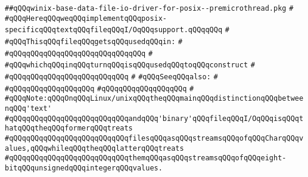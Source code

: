 \label{src/lib/std/src/io/winix-base-data-file-io-driver-for-posix--premicrothread.pkg}
\verb|##qQQqwinix-base-data-file-io-driver-for-posix--premicrothread.pkg|\newline
\verb|#|\newline
\verb|#qQQqHereqQQqweqQQqimplementqQQqposix-specificqQQqtextqQQqfileqQQqI/OqQQqsupport.qQQqqQQq|\newline
\verb|#|\newline
\verb|#qQQqThisqQQqfileqQQqgetsqQQqusedqQQqin:|\newline
\verb|#|\newline
\verb|#qQQqqQQqqQQqqQQqqQQqqQQqqQQqqQQq|\newline
\verb|#|\newline
\verb|#qQQqwhichqQQqinqQQqturnqQQqisqQQqusedqQQqtoqQQqconstruct|\newline
\verb|#|\newline
\verb|#qQQqqQQqqQQqqQQqqQQqqQQqqQQq|\newline
\verb|#|\newline
\verb|#qQQqSeeqQQqalso:|\newline
\verb|#|\newline
\verb|#qQQqqQQqqQQqqQQqqQQq|\newline
\verb|#qQQqqQQqqQQqqQQqqQQq|\newline
\verb|#|\newline
\verb|#qQQqNote:qQQqOnqQQqLinux/unixqQQqtheqQQqmainqQQqdistinctionqQQqbetweenqQQq'text'|\newline
\verb|#qQQqqQQqqQQqqQQqqQQqqQQqqQQqandqQQq'binary'qQQqfileqQQqI/OqQQqisqQQqthatqQQqtheqQQqformerqQQqtreats|\newline
\verb|#qQQqqQQqqQQqqQQqqQQqqQQqqQQqfilesqQQqasqQQqstreamsqQQqofqQQqCharqQQqvalues,qQQqwhileqQQqtheqQQqlatterqQQqtreats|\newline
\verb|#qQQqqQQqqQQqqQQqqQQqqQQqqQQqthemqQQqasqQQqstreamsqQQqofqQQqeight-bitqQQqunsignedqQQqintegerqQQqvalues.|\newline
